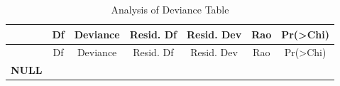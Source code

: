 \documentclass[
]{book}
\begin{document}
\begin{longtable}[]{@{}ccccccc@{}}
\caption{Analysis of Deviance Table}\tabularnewline
\toprule
\begin{minipage}[b]{0.16\columnwidth}\centering
~\strut
\end{minipage} & \begin{minipage}[b]{0.05\columnwidth}\centering
Df\strut
\end{minipage} & \begin{minipage}[b]{0.12\columnwidth}\centering
Deviance\strut
\end{minipage} & \begin{minipage}[b]{0.13\columnwidth}\centering
Resid. Df\strut
\end{minipage} & \begin{minipage}[b]{0.14\columnwidth}\centering
Resid. Dev\strut
\end{minipage} & \begin{minipage}[b]{0.09\columnwidth}\centering
Rao\strut
\end{minipage} & \begin{minipage}[b]{0.13\columnwidth}\centering
Pr(\textgreater Chi)\strut
\end{minipage}\tabularnewline
\midrule
\endfirsthead
\toprule
\begin{minipage}[b]{0.16\columnwidth}\centering
~\strut
\end{minipage} & \begin{minipage}[b]{0.05\columnwidth}\centering
Df\strut
\end{minipage} & \begin{minipage}[b]{0.12\columnwidth}\centering
Deviance\strut
\end{minipage} & \begin{minipage}[b]{0.13\columnwidth}\centering
Resid. Df\strut
\end{minipage} & \begin{minipage}[b]{0.14\columnwidth}\centering
Resid. Dev\strut
\end{minipage} & \begin{minipage}[b]{0.09\columnwidth}\centering
Rao\strut
\end{minipage} & \begin{minipage}[b]{0.13\columnwidth}\centering
Pr(\textgreater Chi)\strut
\end{minipage}\tabularnewline
\midrule
\endhead
\begin{minipage}[t]{0.16\columnwidth}\centering
\textbf{NULL}\strut
\end{minipage} & \begin{minipage}[t]{0.05\columnwidth}\centering

\end{minipage}
\end{longtable}
\end{document}
